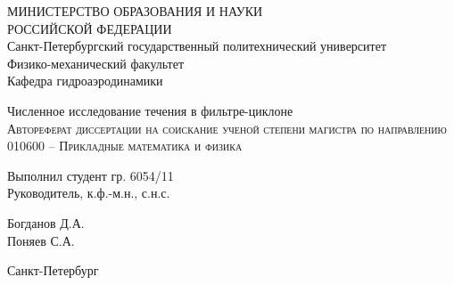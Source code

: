 \renewcommand\normalsize{\fontsize{12pt}{14pt}\selectfont}
\begin{titlepage}
	\begin{center}
		\small{МИНИСТЕРСТВО ОБРАЗОВАНИЯ И НАУКИ \\ РОССИЙСКОЙ ФЕДЕРАЦИИ \\
Санкт-Петербургский государственный политехнический университет \\
Физико-механический факультет \\
Кафедра гидроаэродинамики}\\
		\vspace{0.18\textheight}
	\end{center}
	\begin{center}
		\vspace{0.1\textheight}
		\large{Численное исследование течения в фильтре-циклоне}\\
		\vspace{0.01\textheight}
		\normalsize
		\textsc{Автореферат диссертации на соискание ученой степени магистра по направлению 010600 – Прикладные математика и физика}
		\vspace{0.25\textheight}
	\end{center}
	\begin{minipage}{0.48\textwidth}
		\begin{flushleft}
			Выполнил студент гр. 6054/11\\
			Руководитель, к.ф.-м.н., с.н.с.\\
		\end{flushleft}
	\end{minipage}
	\begin{minipage}{0.5\textwidth}
		\begin{flushright}
			Богданов Д.А. \\
			Поняев С.А. \\
		\end{flushright}
	\end{minipage}
	\vspace{0.1\textheight}
	\begin{center}
		Санкт-Петербург \\
		\the\year
	\end{center}
\end{titlepage}
\newpage
\renewcommand\normalsize{\fontsize{14pt}{24pt}\selectfont}